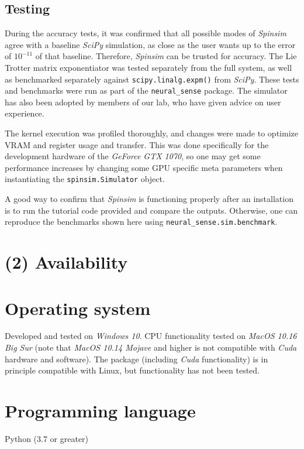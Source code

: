 \documentclass{jors}
\begin{document}
	\subsection{Testing}
		During the accuracy tests, it was confirmed that all possible modes of \emph{Spinsim} agree with a baseline \emph{SciPy} simulation, as close as the user wants up to the error of $ 10^{-11} $ of that baseline.
		Therefore, \emph{Spinsim} can be trusted for accuracy.
		The Lie Trotter matrix exponentiator was tested separately from the full system, as well as benchmarked separately against \texttt{scipy.linalg.expm()} from \emph{SciPy}.
		These tests and benchmarks were run as part of the \texttt{neural\_sense} package.
		The simulator has also been adopted by members of our lab, who have given advice on user experience.

		The kernel execution was profiled thoroughly, and changes were made to optimize VRAM and register usage and transfer.
		This was done specifically for the development hardware of the \emph{GeForce GTX 1070}, so one may get some performance increases by changing some GPU specific meta parameters when instantiating the \texttt{spinsim.Simulator} object.

		A good way to confirm that \emph{Spinsim} is functioning properly after an installation is to run the tutorial code provided and compare the outputs.
		Otherwise, one can reproduce the benchmarks shown here using \texttt{neural\_sense.sim.benchmark}.

\section{(2) Availability}
\vspace{0.5cm}
\section{Operating system}
Developed and tested on \emph{Windows 10}.
CPU functionality tested on \emph{MacOS 10.16 Big Sur} (note that \emph{MacOS 10.14 Mojave} and higher is not compatible with \emph{Cuda} hardware and software).
The package (including \emph{Cuda} functionality) is in principle compatible with Linux, but functionality has not been tested.

\section{Programming language}
Python (3.7 or greater)
\end{document}
